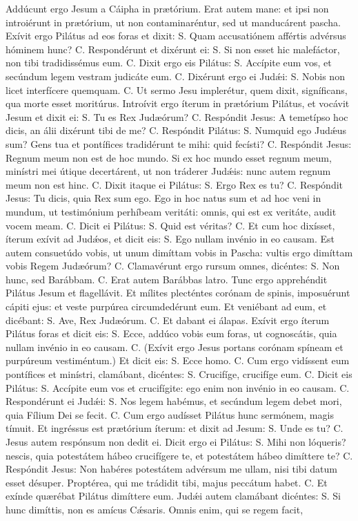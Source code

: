 \begin{paracol}{2}
{Addúcunt ergo Jesum a Cáipha in prætórium. Erat autem mane: et ipsi non introiérunt in prætórium, ut non contaminaréntur, sed ut manducárent pascha. Exívit ergo Pilátus ad eos foras et dixit: {\redx S.} Quam accusatiónem affértis advérsus hóminem hunc? {\redx C.} Respondérunt et dixérunt ei: {\redx S.} Si non esset hic malefáctor, non tibi tradidissémus eum. {\redx C.} Dixit ergo eis Pilátus: {\redx S.} Accípite eum vos, et secúndum legem vestram judicáte eum. {\redx C.} Dixérunt ergo ei Judǽi: {\redx S.} Nobis non licet interfícere quemquam. {\redx C.} Ut sermo Jesu implerétur, quem dixit, signíficans, qua morte esset moritúrus. Introívit ergo íterum in prætórium Pilátus, et vocávit Jesum et dixit ei: {\redx S.} Tu es Rex Judæórum? {\redx C.} Respóndit Jesus: \cruz A temetípso hoc dicis, an álii dixérunt tibi de me? {\redx C.} Respóndit Pilátus: {\redx S.} Numquid ego Judǽus sum? Gens tua et pontífices tradidérunt te mihi: quid fecísti? {\redx C.} Respóndit Jesus: \cruz Regnum meum non est de hoc mundo. Si ex hoc mundo esset regnum meum, minístri mei útique decertárent, ut non tráderer Judǽis: nunc autem regnum meum non est hinc. {\redx C.} Dixit itaque ei Pilátus: {\redx S.} Ergo Rex es tu? {\redx C.} Respóndit Jesus: \cruz Tu dicis, quia Rex sum ego. Ego in hoc natus sum et ad hoc veni in mundum, ut testimónium perhíbeam veritáti: omnis, qui est ex veritáte, audit vocem meam. {\redx C.} Dicit ei Pilátus: {\redx S.} Quid est véritas? {\redx C.} Et cum hoc dixísset, íterum exívit ad Judǽos, et dicit eis: {\redx S.} Ego nullam invénio in eo causam. Est autem consuetúdo vobis, ut unum dimíttam vobis in Pascha: vultis ergo dimíttam vobis Regem Judæórum? {\redx C.} Clamavérunt ergo rursum omnes, dicéntes: {\redx S.} Non hunc, sed Barábbam. {\redx C.} Erat autem Barábbas latro. Tunc ergo apprehéndit Pilátus Jesum et flagellávit. Et mílites plecténtes corónam de spinis, imposuérunt cápiti ejus: et veste purpúrea circumdedérunt eum. Et veniébant ad eum, et dicébant: {\redx S.} Ave, Rex Judæórum. {\redx C.} Et dabant ei álapas. Exívit ergo íterum Pilátus foras et dicit eis: {\redx S.} Ecce, addúco vobis eum foras, ut cognoscátis, quia nullam invénio in eo causam. {\redx C.} (Exívit ergo Jesus portans corónam spíneam et purpúreum vestiméntum.) Et dicit eis: {\redx S.} Ecce homo. {\redx C.} Cum ergo vidíssent eum pontífices et minístri, clamábant, dicéntes: {\redx S.} Crucifíge, crucifíge eum. {\redx C.} Dicit eis Pilátus: {\redx S.} Accípite eum vos et crucifígite: ego enim non invénio in eo causam. {\redx C.} Respondérunt ei Judǽi: {\redx S.} Nos legem habémus, et secúndum legem debet mori, quia Fílium Dei se fecit. {\redx C.} Cum ergo audísset Pilátus hunc sermónem, magis tímuit. Et ingréssus est prætórium íterum: et dixit ad Jesum: {\redx S.} Unde es tu? {\redx C.} Jesus autem respónsum non dedit ei. Dicit ergo ei Pilátus: {\redx S.} Mihi non lóqueris? nescis, quia potestátem hábeo crucifígere te, et potestátem hábeo dimíttere te? {\redx C.} Respóndit Jesus: \cruz Non habéres potestátem advérsum me ullam, nisi tibi datum esset désuper. Proptérea, qui me trádidit tibi, majus peccátum habet. {\redx C.} Et exínde quærébat Pilátus dimíttere eum. Judǽi autem clamábant dicéntes: {\redx S.} Si hunc dimíttis, non es amícus Cǽsaris. Omnis enim, qui se regem facit, }
\end{paracol}
